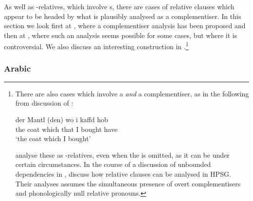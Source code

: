 \documentclass[output=paper
 	        ,biblatex
                ,babelshorthands
                ,newtxmath
                ,draftmode
                ,colorlinks, citecolor=brown
]{langscibook}
\begin{document}
As well as -relatives, which involve s, there are cases of relative clauses
which appear to be headed by what is plausibly analysed as a complementiser. In this
section we look first at , where a complementiser analysis has been proposed and
then at , where such an analysis seems possible for some cases, but where it is
controversial. We also discuss an interesting construction in .\footnote{There are also cases which involve a  \emph{and} a
  complementiser, as in the following from  discussion of  :
  \begin{exe}
    \ex \gll der Mantl (den) wo i kaffd hob\\
    the coat \hphantom{(}which that I bought have\\
    \glt `the coat which I bought’
  \end{exe}
  \citet{Hinrichs:Nakazawa:02} analyse these as -relatives, even when the  is omitted,
  as it can be under certain circumstances. In the course of a discussion of unbounded
  dependencies in , \citet{Assmann:Heck:ea:10} discuss how  relative
  clauses can be analysed in HPSG. Their analyses assumes the simultaneous presence of overt
  complementisers and phonologically null relative pronouns.}

\subsubsection{Arabic}
\label{sec:rc-arabic}
\end{document}
